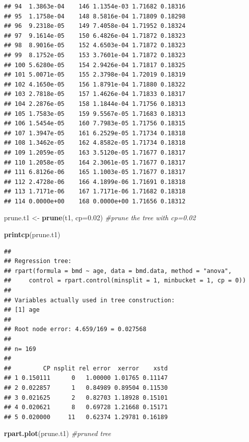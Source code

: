 \documentclass[
]{book}
\newenvironment{Shaded}{\begin{snugshade}}{\end{snugshade}}
\newcommand{\AttributeTok}[1]{\textcolor[rgb]{0.13,0.29,0.53}{#1}}
\newcommand{\CommentTok}[1]{\textcolor[rgb]{0.56,0.35,0.01}{\textit{#1}}}
\newcommand{\FloatTok}[1]{\textcolor[rgb]{0.00,0.00,0.81}{#1}}
\newcommand{\FunctionTok}[1]{\textcolor[rgb]{0.13,0.29,0.53}{\textbf{#1}}}
\newcommand{\NormalTok}[1]{#1}
\newcommand{\OtherTok}[1]{\textcolor[rgb]{0.56,0.35,0.01}{#1}}
\begin{document}
\begin{verbatim}
## 94  1.3863e-04    146 1.1354e-03 1.71682 0.18316
## 95  1.1758e-04    148 8.5816e-04 1.71809 0.18298
## 96  9.2318e-05    149 7.4058e-04 1.71952 0.18324
## 97  9.1614e-05    150 6.4826e-04 1.71872 0.18323
## 98  8.9016e-05    152 4.6503e-04 1.71872 0.18323
## 99  8.1752e-05    153 3.7601e-04 1.71872 0.18323
## 100 5.6280e-05    154 2.9426e-04 1.71817 0.18325
## 101 5.0071e-05    155 2.3798e-04 1.72019 0.18319
## 102 4.1650e-05    156 1.8791e-04 1.71880 0.18322
## 103 2.7818e-05    157 1.4626e-04 1.71833 0.18317
## 104 2.2876e-05    158 1.1844e-04 1.71756 0.18313
## 105 1.7583e-05    159 9.5567e-05 1.71683 0.18313
## 106 1.5454e-05    160 7.7983e-05 1.71756 0.18315
## 107 1.3947e-05    161 6.2529e-05 1.71734 0.18318
## 108 1.3462e-05    162 4.8582e-05 1.71734 0.18318
## 109 1.2059e-05    163 3.5120e-05 1.71677 0.18317
## 110 1.2058e-05    164 2.3061e-05 1.71677 0.18317
## 111 6.8126e-06    165 1.1003e-05 1.71677 0.18317
## 112 2.4728e-06    166 4.1899e-06 1.71691 0.18318
## 113 1.7171e-06    167 1.7171e-06 1.71682 0.18318
## 114 0.0000e+00    168 0.0000e+00 1.71656 0.18312
\end{verbatim}

\begin{Shaded}
\begin{Highlighting}[]
\NormalTok{prune.t1 }\OtherTok{\textless{}{-}} \FunctionTok{prune}\NormalTok{(t1, }\AttributeTok{cp=}\FloatTok{0.02}\NormalTok{)   }\CommentTok{\#prune the tree with cp=0.02}

\FunctionTok{printcp}\NormalTok{(prune.t1)}
\end{Highlighting}
\end{Shaded}

\begin{verbatim}
## 
## Regression tree:
## rpart(formula = bmd ~ age, data = bmd.data, method = "anova", 
##     control = rpart.control(minsplit = 1, minbucket = 1, cp = 0))
## 
## Variables actually used in tree construction:
## [1] age
## 
## Root node error: 4.659/169 = 0.027568
## 
## n= 169 
## 
##         CP nsplit rel error  xerror    xstd
## 1 0.150111      0   1.00000 1.01765 0.11147
## 2 0.022857      1   0.84989 0.89504 0.11530
## 3 0.021625      2   0.82703 1.18928 0.15101
## 4 0.020621      8   0.69728 1.21668 0.15171
## 5 0.020000     11   0.62374 1.29781 0.16189
\end{verbatim}

\begin{Shaded}
\begin{Highlighting}[]
\FunctionTok{rpart.plot}\NormalTok{(prune.t1)              }\CommentTok{\#pruned tree   }
\end{Highlighting}
\end{Shaded}
\end{document}
